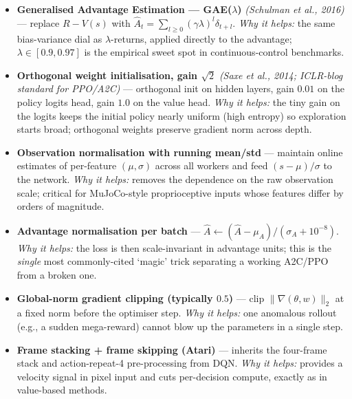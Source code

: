 \documentclass[11pt]{article}
\begin{document}
\begin{itemize}
\item
  \label{trick-4-3-1}\textbf{Generalised Advantage
  Estimation --- GAE(\(\lambda\))} \emph{(Schulman et al., 2016)} ---
  replace \(R - V(s)\) with
  \(\hat A_t = \sum_{l\geq 0}(\gamma\lambda)^l \delta_{t+l}\). \emph{Why
  it helps:} the same bias-variance dial as \(\lambda\)-returns, applied
  directly to the advantage; \(\lambda\!\in\![0.9, 0.97]\) is the
  empirical sweet spot in continuous-control benchmarks.
\item
  \label{trick-4-3-2}\textbf{Orthogonal weight
  initialisation, gain \(\sqrt{2}\)} \emph{(Saxe et al., 2014; ICLR-blog
  standard for PPO/A2C)} --- orthogonal init on hidden layers, gain
  \(0.01\) on the policy logits head, gain \(1.0\) on the value head.
  \emph{Why it helps:} the tiny gain on the logits keeps the initial
  policy nearly uniform (high entropy) so exploration starts broad;
  orthogonal weights preserve gradient norm across depth.
\item
  \label{trick-4-3-3}\textbf{Observation normalisation
  with running mean/std} --- maintain online estimates of per-feature
  \((\mu, \sigma)\) across all workers and feed \((s - \mu)/\sigma\) to
  the network. \emph{Why it helps:} removes the dependence on the raw
  observation scale; critical for MuJoCo-style proprioceptive inputs
  whose features differ by orders of magnitude.
\item
  \label{trick-4-3-4}\textbf{Advantage normalisation per
  batch} ---
  \(\hat A \leftarrow (\hat A - \mu_A)/(\sigma_A + 10^{-8})\). \emph{Why
  it helps:} the loss is then scale-invariant in advantage units; this
  is the \emph{single} most commonly-cited `magic' trick separating a
  working A2C/PPO from a broken one.
\item
  \label{trick-4-3-5}\textbf{Global-norm gradient
  clipping (typically \(0.5\))} --- clip \(\|\nabla(\theta,w)\|_2\) at a
  fixed norm before the optimiser step. \emph{Why it helps:} one
  anomalous rollout (e.g., a sudden mega-reward) cannot blow up the
  parameters in a single step.
\item
  \label{trick-4-3-6}\textbf{Frame stacking + frame
  skipping (Atari)} --- inherits the four-frame stack and
  action-repeat-4 pre-processing from DQN. \emph{Why it helps:} provides
  a velocity signal in pixel input and cuts per-decision compute,
  exactly as in value-based methods.
\end{itemize}
\end{document}
